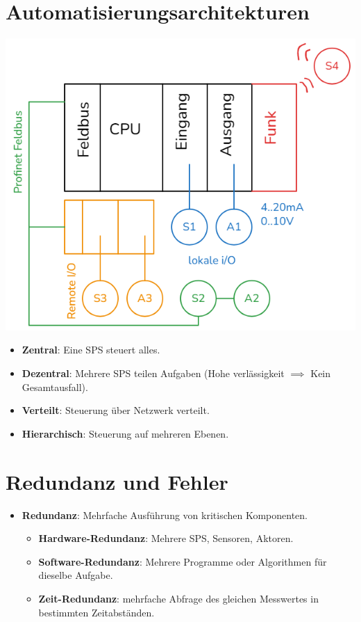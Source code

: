 \documentclass[8pt, landscape]{article}
\newcommand{\algo}[1]{\textbf{\textcolor{blue!60!black}{#1}}}
\newcommand{\datastruct}[1]{\textbf{\textcolor{red!60!black}{#1}}}
\begin{document}
\begin{multicols*}{4}
\section{Automatisierungsarchitekturen}
\includegraphics[width=0.6\linewidth]{assets/ATK.png}
\begin{itemize}
    \item \datastruct{Zentral}: Eine SPS steuert alles.
    \item \datastruct{Dezentral}: Mehrere SPS teilen Aufgaben (Hohe verlässigkeit $\implies$ Kein Gesamtausfall).
    \item \datastruct{Verteilt}: Steuerung über Netzwerk verteilt.
    \item \datastruct{Hierarchisch}: Steuerung auf mehreren Ebenen.
\end{itemize}

\section{Redundanz und Fehler}

\begin{itemize}
\item \algo{Redundanz}: Mehrfache Ausführung von kritischen Komponenten.
\begin{itemize}
    \item \datastruct{Hardware-Redundanz}: Mehrere SPS, Sensoren, Aktoren.
    \item \datastruct{Software-Redundanz}: Mehrere Programme oder Algorithmen für dieselbe Aufgabe.
    \item \datastruct{Zeit-Redundanz}: mehrfache Abfrage des gleichen Messwertes in bestimmten Zeitabständen.
\end{itemize}


\end{itemize}
\end{multicols*}
\end{document}

